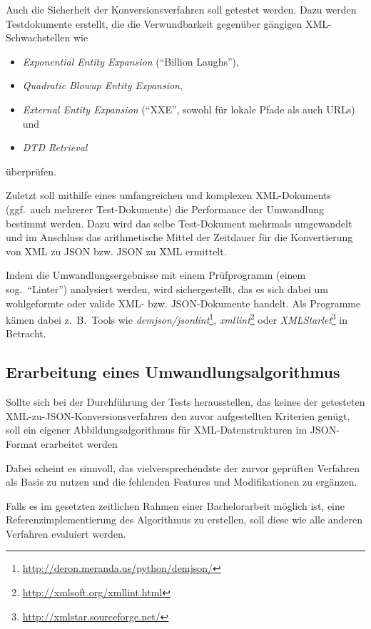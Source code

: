 \documentclass[conference]{template/IEEEtran}
\begin{document}
Auch die Sicherheit der Konversionsverfahren soll getestet werden. Dazu werden
Testdokumente erstellt, die die Verwundbarkeit gegenüber gängigen
XML-Schwachstellen\cite{morgan2014xml,spaeth2016sok} wie
\begin{itemize}
    \item \emph{Exponential Entity Expansion} (\enquote{Billion Laughs}),
    \item \emph{Quadratic Blowup Entity Expansion},
    \item \emph{External Entity Expansion} (\enquote{XXE}, sowohl für lokale Pfade als auch
    URLs)\cite{steuck2002xxe} und
\item \emph{DTD Retrieval}
\end{itemize}
überprüfen.

Zuletzt soll mithilfe eines umfangreichen und komplexen XML-Dokuments
(ggf.~auch mehrerer Test-Dokumente) die Performance der Umwandlung bestimmt
werden. Dazu wird das selbe Test-Dokument mehrmals
umgewandelt und im Anschluss das arithmetische Mittel der Zeitdauer für die
Konvertierung von XML zu JSON bzw. JSON zu XML ermittelt.

Indem die Umwandlungsergebnisse mit einem Prüfprogramm
(einem sog.\ \enquote{Linter}) analysiert werden, wird sichergestellt, das es
sich dabei um wohlgeformte oder valide XML- bzw. JSON-Dokumente handelt. Als
Programme kämen dabei z.~B.\ Tools wie
\emph{demjson/jsonlint}\footnote{\url{http://deron.meranda.us/python/demjson/}},
\emph{xmllint}\footnote{\url{http://xmlsoft.org/xmllint.html}} oder
\emph{XMLStarlet}\footnote{\url{http://xmlstar.sourceforge.net/}} in Betracht.

\subsection{Erarbeitung eines Umwandlungsalgorithmus}
\label{subsec:development}

Sollte sich bei der Durchführung der Tests herausstellen, das keines der
getesteten XML-zu-JSON-Konversionsverfahren den zuvor aufgestellten Kriterien
genügt, soll ein eigener Abbildungsalgorithmus für
XML-Datenstrukturen im JSON-Format erarbeitet werden

Dabei scheint es sinnvoll, das vielversprechendste der zurvor geprüften
Verfahren als Basis zu nutzen und die fehlenden Features und Modifikationen
zu ergänzen.

Falls es im gesetzten zeitlichen Rahmen einer Bachelorarbeit möglich ist, eine
Referenzimplementierung des Algorithmus zu erstellen, soll diese wie alle
anderen Verfahren evaluiert werden.
\end{document}
